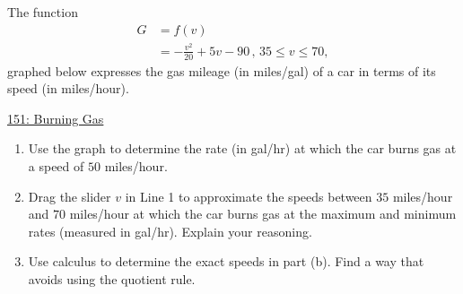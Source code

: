 \documentclass{ximera}
\begin{document}
\begin{question} \label{Q5hhhhgeyghhg}
The function
\begin{align*}
    G  &= f(v)    \\
         &=  -\frac{v^2}{20} + 5v -90 \, , \, 35\leq v \leq 70 ,
\end{align*}
graphed below expresses the gas mileage (in miles/gal) of a car in terms of its speed (in miles/hour).

\begin{onlineOnly}
    \begin{center}
\end{center}
\end{onlineOnly}

\href{https://www.desmos.com/calculator/fapdhcqptl}{151: Burning Gas}

\begin{enumerate}
\item Use the graph to determine the rate (in gal/hr) at which the car burns gas at a speed of $50$ miles/hour.

\item Drag the slider $v$ in Line 1 to approximate the speeds between $35$ miles/hour and $70$ miles/hour at which the car burns gas at the maximum and minimum rates (measured in gal/hr). Explain your reasoning.

\item Use calculus to determine the exact speeds in part (b). Find a way that avoids using the quotient rule.

\end{enumerate}


\end{question}
\end{document}
